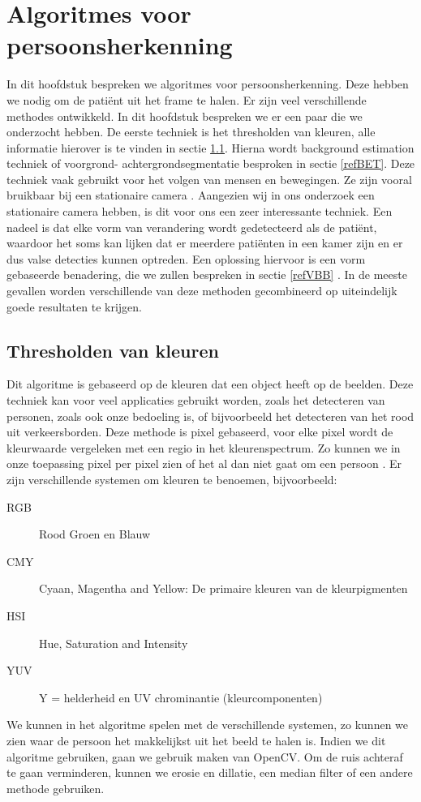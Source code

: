 \section{Algoritmes voor persoonsherkenning}
\label{refAVPH}
In dit hoofdstuk bespreken we algoritmes voor persoonsherkenning. Deze hebben we nodig om de pati\"ent uit het frame te halen. Er zijn veel verschillende methodes ontwikkeld. In dit hoofdstuk bespreken we er een paar die we onderzocht hebben.  De eerste techniek is het thresholden van kleuren, alle informatie hierover is te vinden in sectie \ref{refTVK}. Hierna wordt background estimation techniek of voorgrond- achtergrondsegmentatie besproken in sectie \ref{refBET}. Deze techniek vaak gebruikt voor het volgen van mensen en bewegingen. Ze zijn vooral bruikbaar bij een stationaire camera \cite{bibIRC}. Aangezien wij in ons onderzoek een stationaire camera hebben, is dit voor ons een zeer interessante techniek. Een nadeel is dat elke vorm van verandering wordt gedetecteerd als de pati\"ent, waardoor het soms kan lijken dat er meerdere pati\"enten in een kamer zijn en er dus valse detecties kunnen optreden. Een oplossing hiervoor is een vorm gebaseerde benadering, die we zullen bespreken in sectie \ref{refVBB} \cite{bibIRC}. In de meeste gevallen worden verschillende van deze methoden gecombineerd op uiteindelijk goede resultaten te krijgen. 

\subsection{Thresholden van kleuren}
\label{refTVK}
Dit algoritme is gebaseerd op de kleuren dat een object heeft op de beelden. Deze techniek kan voor veel applicaties gebruikt worden, zoals het detecteren van personen, zoals ook onze bedoeling is, of bijvoorbeeld het detecteren van het rood uit verkeersborden. Deze methode is pixel gebaseerd, voor elke pixel wordt de kleurwaarde vergeleken met een regio in het kleurenspectrum. Zo kunnen we in onze toepassing pixel per pixel zien of het al dan niet gaat om een persoon \cite{bibTHK}. Er zijn verschillende systemen om kleuren te benoemen, bijvoorbeeld:
\begin{description}
	\item[RGB] Rood Groen en Blauw
	\item [CMY] Cyaan, Magentha and Yellow: De primaire kleuren van de kleurpigmenten
	\item [HSI] Hue, Saturation and Intensity
	\item [YUV] Y = helderheid en UV chrominantie (kleurcomponenten)
\end{description}
We kunnen in het algoritme spelen met de verschillende systemen, zo kunnen we zien waar de persoon het makkelijkst uit het beeld te halen is. Indien we dit algoritme gebruiken, gaan we gebruik maken van OpenCV. Om de ruis achteraf te gaan verminderen, kunnen we erosie en dillatie, een median filter of een andere methode gebruiken. 
 
